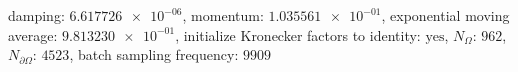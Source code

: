 damping: $\num[scientific-notation=true]{6.617726e-06}$, momentum: $\num[scientific-notation=true]{1.035561e-01}$, exponential moving average: $\num[scientific-notation=true]{9.813230e-01}$, initialize Kronecker factors to identity: $\text{yes}$, $N_{\Omega}$: $\num[scientific-notation=false]{962}$, $N_{\partial\Omega}$: $\num[scientific-notation=false]{4523}$, batch sampling frequency: $\num[scientific-notation=false]{9909}$